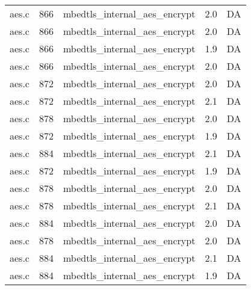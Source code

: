 \begin{table}[h!]
\begin{tabular}{lrlrr}
aes.c& 866&mbedtls\_internal\_aes\_encrypt&2.0 &DA\\
aes.c& 866&mbedtls\_internal\_aes\_encrypt&2.0 &DA\\
aes.c& 866&mbedtls\_internal\_aes\_encrypt&1.9 &DA\\
aes.c& 866&mbedtls\_internal\_aes\_encrypt&2.0 &DA\\
aes.c& 872&mbedtls\_internal\_aes\_encrypt&2.0 &DA\\
aes.c& 872&mbedtls\_internal\_aes\_encrypt&2.1 &DA\\
aes.c& 878&mbedtls\_internal\_aes\_encrypt&2.0 &DA\\
aes.c& 872&mbedtls\_internal\_aes\_encrypt&1.9 &DA\\
aes.c& 884&mbedtls\_internal\_aes\_encrypt&2.1 &DA\\
aes.c& 872&mbedtls\_internal\_aes\_encrypt&1.9 &DA\\
aes.c& 878&mbedtls\_internal\_aes\_encrypt&2.0 &DA\\
aes.c& 878&mbedtls\_internal\_aes\_encrypt&2.1 &DA\\
aes.c& 884&mbedtls\_internal\_aes\_encrypt&2.0 &DA\\
aes.c& 878&mbedtls\_internal\_aes\_encrypt&2.0 &DA\\
aes.c& 884&mbedtls\_internal\_aes\_encrypt&2.1 &DA\\
aes.c& 884&mbedtls\_internal\_aes\_encrypt&1.9 &DA\\
\hline
\end{tabular}
\renewcommand{\baselinestretch}{1.0}\selectfont
\end{table}

